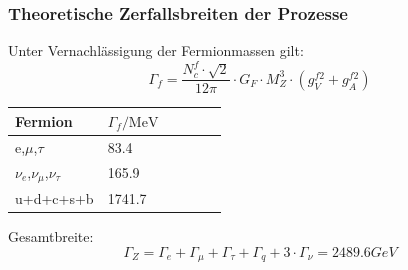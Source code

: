 \begin{frame}
	\frametitle{Theoretische Zerfallsbreiten der Prozesse}
	Unter Vernachlässigung der Fermionmassen gilt:
	\begin{equation*}	
	\Gamma_f=\frac{N_c^f \cdot \sqrt{2}}{12\pi}\cdot G_F \cdot M_Z^3 \cdot (g_V^{f2}+g_A^{f2})
	\end{equation*}
	\begin{table}[H]\centering
		\begin{tabular}{@{}llllll@{}}
			\toprule
			Fermion & $\Gamma _f\text{/MeV}$ \\
			\midrule
			e,$\mu $,$\tau $ & 83.4\\
			$\nu _e$,$\nu _{\mu }$,$\nu _{\tau }$ & 165.9\\
			u+d+c+s+b & 1741.7 \\
			\bottomrule
		\end{tabular}
	\end{table}
	Gesamtbreite:
	\begin{equation*}
	\Gamma_Z = \Gamma_e+ \Gamma_{\mu} + \Gamma_{\tau}+\Gamma_q + 3 \cdot \Gamma_{\nu}= 2489.6 GeV
	\end{equation*}
\end{frame}
